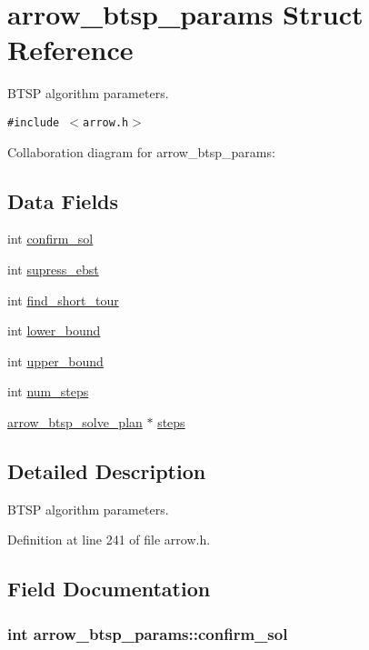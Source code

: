 \hypertarget{structarrow__btsp__params}{
\section{arrow\_\-btsp\_\-params Struct Reference}
\label{structarrow__btsp__params}
}
BTSP algorithm parameters.  


{\tt \#include $<$arrow.h$>$}

Collaboration diagram for arrow\_\-btsp\_\-params:\subsection*{Data Fields}
\begin{CompactItemize}
\item 
int \hyperlink{structarrow__btsp__params_2c579feb3ff41f4d73b5de97596fe465}{confirm\_\-sol}
\item 
int \hyperlink{structarrow__btsp__params_cd85b850ac7c8495a4689100e8c3182c}{supress\_\-ebst}
\item 
int \hyperlink{structarrow__btsp__params_f5fd677200b64930838c6905cbada990}{find\_\-short\_\-tour}
\item 
int \hyperlink{structarrow__btsp__params_da747e3797f9327834e4dbb1459d2786}{lower\_\-bound}
\item 
int \hyperlink{structarrow__btsp__params_b8749004215015a78139b8e4e1fb8905}{upper\_\-bound}
\item 
int \hyperlink{structarrow__btsp__params_2897d24f2fdd53c723609cf68880f55e}{num\_\-steps}
\item 
\hyperlink{structarrow__btsp__solve__plan}{arrow\_\-btsp\_\-solve\_\-plan} $\ast$ \hyperlink{structarrow__btsp__params_49aedb95b2fc4a725e3bb8485470484b}{steps}
\end{CompactItemize}


\subsection{Detailed Description}
BTSP algorithm parameters. 

Definition at line 241 of file arrow.h.

\subsection{Field Documentation}
\hypertarget{structarrow__btsp__params_2c579feb3ff41f4d73b5de97596fe465}{
\subsubsection{\setlength{\rightskip}{0pt plus 5cm}int {\bf arrow\_\-btsp\_\-params::confirm\_\-sol}}}
\label{structarrow__btsp__params_2c579feb3ff41f4d73b5de97596fe465}


